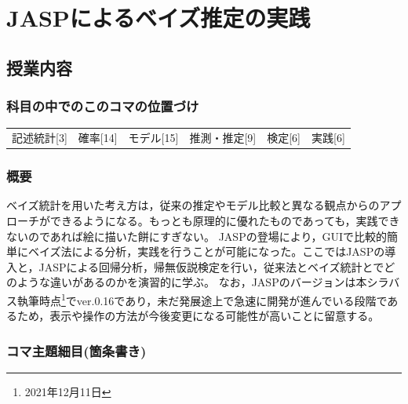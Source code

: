 \section{JASPによるベイズ推定の実践}
\label{s28_jasp}

\subsection{授業内容}
\subsubsection{科目の中でのこのコマの位置づけ}
\begin{tabular}[t]{cccccc}
	記述統計[3] & 確率[14] & モデル[15] & 推測・推定[9] & 検定[6] & 実践[6]
\end{tabular}
\subsubsection{概要}
ベイズ統計を用いた考え方は，従来の推定やモデル比較と異なる観点からのアプローチができるようになる。もっとも原理的に優れたものであっても，実践できないのであれば絵に描いた餅にすぎない。
JASPの登場により，GUIで比較的簡単にベイズ法による分析，実践を行うことが可能になった。ここではJASPの導入と，JASPによる回帰分析，帰無仮説検定を行い，従来法とベイズ統計とでどのような違いがあるのかを演習的に学ぶ。
なお，JASPのバージョンは本シラバス執筆時点\footnote{2021年12月11日}でver.0.16であり，未だ発展途上で急速に開発が進んでいる段階であるため，表示や操作の方法が今後変更になる可能性が高いことに留意する。
\subsubsection{コマ主題細目(箇条書き)}

